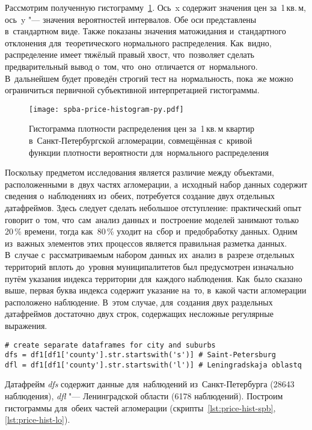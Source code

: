 \documentclass[]{scrartcl}
\begin{document}
Рассмотрим полученную гистограмму~\ref{fig:spba-prices-hist}. Ось~x содержит значения цен за~1\,кв.\,м, ось~y "--- значения вероятностей интервалов. Обе оси представлены в~стандартном виде. Также показаны значения матожидания и~стандартного отклонения для~теоретического нормального распределения. Как~видно, распределение имеет тяжёлый правый хвост, что~позволяет сделать предварительный вывод о~том, что~оно~отличается от~нормального. В~дальнейшем будет проведён строгий тест на~нормальность, пока~же можно ограничиться первичной субъективной интерпретацией гистограммы.
%
\begin{figure}[ht]
	\centering
	\texttt{[image: spba-price-histogram-py.pdf]}
	\caption{Гистограмма плотности распределения цен за~1\,кв.\,м квартир в~Санкт-Петербургской агломерации, совмещённая с~кривой функции плотности вероятности для~нормального распределения}
	\label{fig:spba-prices-hist}
\end{figure}
%
Поскольку предметом исследования является различие между объектами, расположенными в~двух частях агломерации, а~исходный набор данных содержит сведения о~наблюдениях из~обеих, потребуется создание двух отдельных датафреймов. Здесь следует сделать небольшое отступление: практический опыт говорит о~том, что~сам~анализ данных и~построение моделей занимают только 20\,\% времени, тогда как~80\,\% уходит на~сбор и~предобработку данных. Одним из~важных элементов этих процессов является правильная разметка данных. В~случае с~рассматриваемым набором данных их~анализ в~разрезе отдельных территорий вплоть до~уровня муниципалитетов был предусмотрен изначально путём указания индекса территории для~каждого наблюдения. Как~было сказано выше, первая буква индекса содержит указание на~то, в~какой части агломерации расположено наблюдение. В~этом случае, для~создания двух раздельных датафреймов достаточно двух строк, содержащих несложные регулярные выражения.
%
\begin{lstlisting}[float, caption = Создание отдельных датафреймов для~Санкт-Петербурга и~Ленинградской области, firstnumber=1, label= lst:create-two-separate-df-for-S-Pb-LO]
# create separate dataframes for city and suburbs
dfs = df1[df1['county'].str.startswith('s')] # Saint-Petersburg
dfl = df1[df1['county'].str.startswith('l')] # Leningradskaja oblastq
\end{lstlisting}
%
Датафрейм \emph{dfs} содержит данные для~наблюдений из~Санкт-Петербурга (28643 наблюдения), \emph{dfl} "--- Ленинградской области (6178 наблюдений). Построим гистограммы для~обеих частей агломерации (скрипты~\ref{lst:price-hist-spb}, \ref{lst:price-hist-lo}).
\end{document}
